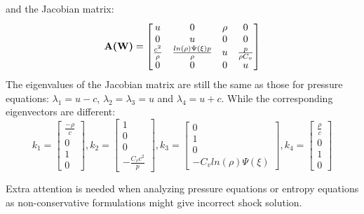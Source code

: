 and the Jacobian matrix: 
\begin{equation}
   \textbf{A(\textbf{W})}=\begin{bmatrix}
         u & 0 & \rho & 0 \\
         0 & u & 0 & 0 \\
         \frac{c^2}{\rho} & \frac{ ln(\rho) \Psi(\xi) p}{\rho} & u &\frac{p}{\rho C_v} \\
         0 & 0 & 0 & u
     \end{bmatrix}
\end{equation}
The eigenvalues of the Jacobian matrix are still the same as those for pressure equations: $\lambda_1 = u-c$,  $\lambda_2 = \lambda_3 = u$ and $\lambda_4 = u+c$. While the corresponding eigenvectors are different: 
\begin{equation}
   k_1 =\begin{bmatrix}
         \frac{-\rho}{c} \\
         0 \\
         1 \\
         0
     \end{bmatrix},
   k_2 =\begin{bmatrix}
         1 \\
         0 \\
         0   \\
         -\frac{C_v c^2}{p}
     \end{bmatrix},
   k_3 =\begin{bmatrix}
         0 \\
         1 \\
         0   \\
         -C_v ln (\rho) \Psi(\xi)
     \end{bmatrix},
   k_4 =\begin{bmatrix}
         \frac{\rho}{c} \\
         0 \\
         1 \\
         0
     \end{bmatrix}
     \label{eq:eigenvector-entropy}
\end{equation}

Extra attention is needed when analyzing pressure equations or entropy equations as non-conservative formulations might give incorrect shock solution.
 
